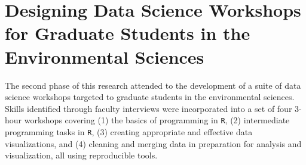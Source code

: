 \documentclass[12pt]{article}
\begin{document}

\section{Designing Data Science Workshops for Graduate Students in the 
Environmental Sciences}
\label{sec:workshops}

\quad The second phase of this research attended to the  development of a suite
of data science workshops targeted to graduate students in the environmental
sciences. Skills identified through faculty interviews were incorporated into a
set of four 3-hour workshops covering (1) the basics of programming in 
\texttt{R}, (2) intermediate programming tasks in \texttt{R}, (3) creating
appropriate and effective data visualizations, and (4) cleaning and merging data
in preparation for analysis and visualization, all using reproducible tools. 
\end{document}
